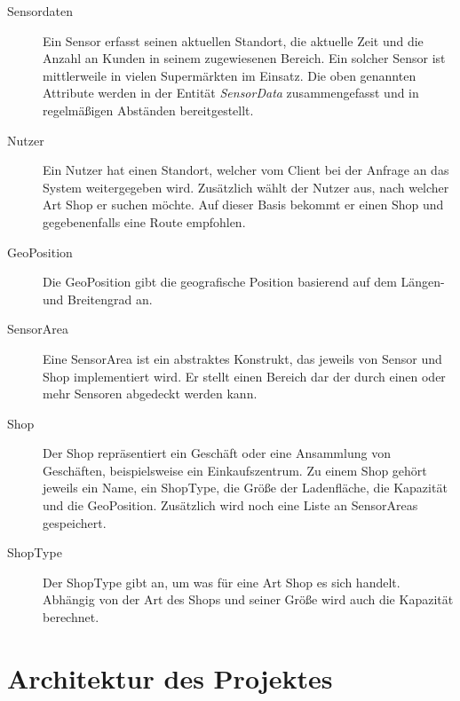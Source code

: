 \documentclass[runningheads]{llncs}
\begin{document}
\begin{description}
	\item[Sensordaten] Ein Sensor erfasst seinen aktuellen Standort, die aktuelle Zeit und die Anzahl an Kunden in seinem zugewiesenen Bereich. Ein solcher Sensor ist mittlerweile in vielen Supermärkten im Einsatz. Die oben genannten Attribute werden in der Entität \textit{SensorData} zusammengefasst und in regelmäßigen Abständen bereitgestellt.
	\item[Nutzer] Ein Nutzer hat einen Standort, welcher vom Client bei der Anfrage an das System weitergegeben wird. Zusätzlich wählt der Nutzer aus, nach welcher Art Shop er suchen möchte. Auf dieser Basis bekommt er einen Shop und gegebenenfalls eine Route empfohlen.
	\item[GeoPosition] Die GeoPosition gibt die geografische Position basierend auf dem Längen- und Breitengrad an.
	\item[SensorArea] Eine SensorArea ist ein abstraktes Konstrukt, das jeweils von Sensor und Shop implementiert wird. Er stellt einen Bereich dar der durch einen oder mehr Sensoren abgedeckt werden kann.
	\item[Shop] Der Shop repräsentiert ein Geschäft oder eine Ansammlung von Geschäften, beispielsweise ein Einkaufszentrum. Zu einem Shop gehört jeweils ein Name, ein ShopType, die Größe der Ladenfläche, die Kapazität und die GeoPosition. Zusätzlich wird noch eine Liste an SensorAreas gespeichert.
	\item[ShopType] Der ShopType gibt an, um was für eine Art Shop es sich handelt.
Abhängig von der Art des Shops und seiner Größe wird auch die Kapazität berechnet.
	
\end{description}


\section{Architektur des Projektes}
\end{document}
